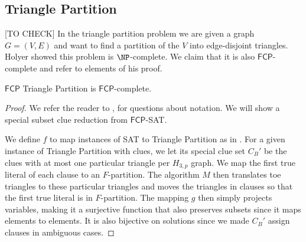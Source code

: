 \documentclass[runningheads,a4paper]{llncs}
\begin{document}
%
%
%
%
%

\subsection{Triangle Partition}
[TO CHECK] 
In the triangle partition problem we are given a graph $G = (V,E)$ and want to find a partition of the $V$ into edge-disjoint triangles. Holyer  \cite{holyer1981np} showed this problem is $\NP$-complete. We claim that it is also $\mathsf{FCP}$-complete and refer to elements of his proof. 

\begin{theorem}
$\mathsf{FCP}$ Triangle Partition is $\mathsf{FCP}$-complete.
\end{theorem}

\begin{proof}
We refer the reader to \cite{holyer1981np}, \cite{colbourn1984complexity} for questions about notation. We will show a special subset clue reduction from $\mathsf{FCP}$-SAT. 

We define $f$ to map instances of SAT to Triangle Partition as in \cite{holyer1981np}. For a given instance of Triangle Partition with clues, we let its special clue set $C_B'$ be the clues with at most one particular triangle per $H_{3,p}$ graph. We map the first true literal of each clause to an $F$-partition. The algorithm $M$ then translates toe triangles to these particular triangles and moves the triangles in clauses so that the first true literal is in $F$-partition. The mapping $g$ then simply projects variables, making it a surjective function that also preserves subsets since it maps elements to elements. It is also bijective on solutions since we made $C_B'$ assign clauses in ambiguous cases.   
\end{proof}
\end{document}
